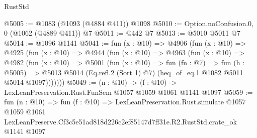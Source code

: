 \begin{lexlean}{RustStd}
\begin{coremodule}
@5005 := @1083 (@1093 (@4884 @411)) @1098
@5010 := Option.noConfusion.{0, 0} (@1062 (@4889 @411)) @7
@5011 := @442 @7
@5013 := @5010 @5011 @7
@5014 := @1096 @1141
@5041 := fun (x : @10) =>
  @4906
    (fun (x : @10) =>
    @4925
      (fun (x : @10) =>
      @4944
        (fun (x : @10) =>
        @4963
          (fun (x : @10) =>
          @4982
            (fun (x : @10) =>
            @5001
              (fun (x : @10) =>
              fun (fn : @7) =>
              fun (h : @5005) =>
              @5013 @5014 (Eq.refl.{2} (Sort 1) @7) (heq_of_eq.{1} @1082 @5011 @5014 @1097)))))))
@5049 := (n : @10) -> (f : @10) -> LexLeanPreservation.Rust.FunSem @1057 @1059 @1061 @1141 @1097
@5059 := fun (n : @10) =>
  fun (f : @10) =>
  LexLeanPreservation.Rust.simulate
    @1057
    @1059
    @1061
    LexLeanPreserve.Cf3c5e51ad818d226c2ef85147d7ff31e.R2.RustStd.crate_ok
    @1141
    @1097
\end{coremodule}
\end{lexlean}
